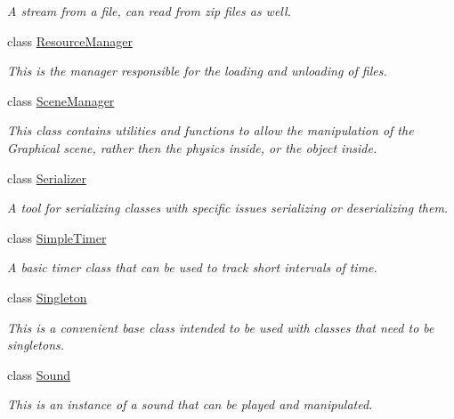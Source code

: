 \begin{DoxyCompactItemize}
\begin{DoxyCompactList}\small\item\em A stream from a file, can read from zip files as well. \item\end{DoxyCompactList}\item 
class \hyperlink{classphys_1_1ResourceManager}{ResourceManager}
\begin{DoxyCompactList}\small\item\em This is the manager responsible for the loading and unloading of files. \item\end{DoxyCompactList}\item 
class \hyperlink{classphys_1_1SceneManager}{SceneManager}
\begin{DoxyCompactList}\small\item\em This class contains utilities and functions to allow the manipulation of the Graphical scene, rather then the physics inside, or the object inside. \item\end{DoxyCompactList}\item 
class \hyperlink{classphys_1_1Serializer}{Serializer}
\begin{DoxyCompactList}\small\item\em A tool for serializing classes with specific issues serializing or deserializing them. \item\end{DoxyCompactList}\item 
class \hyperlink{classphys_1_1SimpleTimer}{SimpleTimer}
\begin{DoxyCompactList}\small\item\em A basic timer class that can be used to track short intervals of time. \item\end{DoxyCompactList}\item 
class \hyperlink{classphys_1_1Singleton}{Singleton}
\begin{DoxyCompactList}\small\item\em This is a convenient base class intended to be used with classes that need to be singletons. \item\end{DoxyCompactList}\item 
class \hyperlink{classphys_1_1Sound}{Sound}
\begin{DoxyCompactList}\small\item\em This is an instance of a sound that can be played and manipulated. \item\end{DoxyCompactList}\item 

\end{DoxyCompactItemize}

